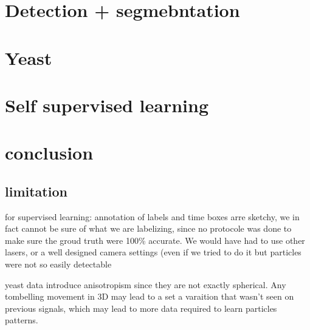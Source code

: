 \documentclass{article}
\begin{document}
\section{Detection + segmebntation}

\section{Yeast}

\section{Self supervised learning}


\section{conclusion}
\subsection{limitation}
for supervised learning: annotation of labels and time boxes arre sketchy, we in fact cannot be sure of what we are labelizing, since no protocole was done to make sure the groud truth were 100\% accurate. We would have had to use other lasers, or a well designed camera settings (even if we tried to do it but particles were not so easily detectable

yeast data introduce anisotropism since they are not exactly spherical. Any tombelling movement in 3D may lead to a set a varaition that wasn't seen on previous signals, which may lead to more data required to learn particles patterns.
\end{document}
